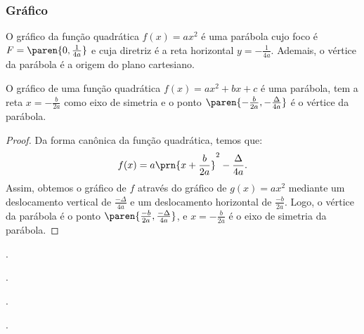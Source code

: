 \subsubsection{Gráfico}

\begin{example}
O gráfico da função quadrática $f(x) = ax^2$ é uma parábola cujo
foco é $F = \paren{0, \frac 1 {4a}}$ e cuja diretriz é a reta
horizontal $y = -\frac{1}{4a}$. Ademais, o vértice da parábola é a
origem do plano cartesiano.
\end{example}

\begin{proposition}
O gráfico de uma função quadrática $f(x) = ax^2 + bx + c$ é uma
parábola, tem a reta $x = -\frac {b}{2a}$ como eixo de simetria e o
ponto $\paren{-\frac {b} {2a}, -\frac {\Delta} {4a}}$ é o vértice da
parábola.
\end{proposition}

\begin{proof}
	Da forma canônica da função quadrática, temos que:
	\[
		f(x) = a\prn{x+\frac b {2a}}^2 - \frac{\Delta}{4a}.
	\]
	\noindent Assim, obtemos o gráfico de $f$ através do gráfico de $g(x) = ax^2$
	mediante um deslocamento vertical de $\frac{-\Delta}{4a}$ e um deslocamento
	horizontal de $\frac{-b}{2a}$.
	Logo, o vértice da parábola é o ponto $\paren{\frac{-b}{2a}, \frac{-\Delta}{4a}}$, e 
	$x=-\frac{b}{2a}$ é o eixo de simetria da parábola.
\end{proof}

\begin{onlineact}
	.
\end{onlineact}

\begin{onlineact}
	.
\end{onlineact}

\begin{onlineact}
	.
\end{onlineact}

\begin{onlineact}
	.
\end{onlineact}